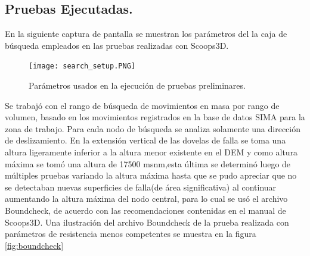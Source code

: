 \subsection{Pruebas Ejecutadas.}
En la siguiente captura de pantalla se muestran los par\'{a}metros del la caja de b\'{u}squeda
empleados en las pruebas realizadas con Scoops3D.\\

\begin{figure}[H]
\centering
	\texttt{[image: search\_setup.PNG]} 
	\caption{Par\'ametros usados en la ejecuci\'on de pruebas preliminares.}
	\label{fig:test}
\end{figure}


Se trabaj\'{o} con el rango de b\'{u}squeda de movimientos en masa por rango de volumen,
basado en los movimientos registrados en la base de datos SIMA para la zona de trabajo.
Para cada nodo de b\'{u}squeda se analiza solamente una direcci\'{o}n de deslizamiento.
En la extensi\'{o}n vertical de las dovelas de falla se toma una altura ligeramente inferior a la
altura menor existente en el DEM y como altura m\'{a}xima se tom\'{o} una altura de 17500
msnm,esta \'{u}ltima se determin\'{o} luego de m\'{u}ltiples pruebas variando la altura m\'{a}xima hasta
que se pudo apreciar que no se detectaban nuevas superficies de falla(de \'area significativa) al continuar
aumentando la altura m\'{a}xima del nodo central, para lo cual se us\'{o} el archivo Boundcheck, de acuerdo con las recomendaciones contenidas en el manual de Scoops3D. Una ilustraci\'on del archivo Boundcheck de la prueba realizada con par\'ametros de resistencia menos competentes se muestra en la figura \ref{fig:boundcheck} 


